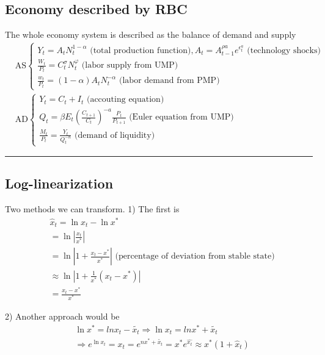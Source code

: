 \documentclass{article}
\newcommand*\sepline{%
  \begin{center}
    \rule[1ex]{.5\textwidth}{.5pt}
  \end{center}}
\begin{document}
\subsection{Economy described by RBC}
{\color{red}
The whole economy system is described as the balance of demand and supply
\begin{align}
&\text{AS}
\begin{cases} Y_{t}=A_{t}N_{t}^{1-\alpha} \text{ (total production function)}, A_t=A^{\rho a}_{t-1} e^{\epsilon^a_t} \text{ (technology shocks)}\\
\frac{W_{t}}{P_{t}}=C_{t}^{\sigma}N_{t}^{\varphi} \text{ (labor supply from UMP)}\\
\frac{w_{t}}{P_{t}}=(1-\alpha)A_{t}N_{t}^{-\alpha} \text{ (labor demand from PMP)}
\end{cases}
\\&
\text{AD}
\begin{cases}Y_{t}=C_{t}+I_{t} \text{ (accouting equation)}\\
Q_{t}=\beta E_{t} (\frac{C_{t+1}}{C_{t}})^{-a} \frac{P_{t}}{P_{t+1}}  \text{ (Euler equation from UMP)}\\
\frac{M_{t}}{P_{t}}=\frac{Y_{t}}{Q_{t}^{-n}}  \text{ (demand of liquidity)}
\end{cases}
\end{align}
}


\sepline
\subsection{Log-linearization}

Two methods we can transform. 
1) The first is 
\begin{align}
&
\hat x_{t}=\ln x_{t}-\ln x^{*}
\\&
=\ln |\frac{ x_{t}}{x^{*}}| 
\\&
=\ln |1+ \frac{x_{t}-x^{*}}{x^{*}}| \text{ (percentage of deviation from stable state)}
\\&
\approx \ln |1+\frac{1}{x^{*}}(x_{t}-x^{*})|
\\&
=\frac{x_{t}-x^{*}}{x^{*}}
\end{align}

2) Another approach would be
\begin{align}
&\ln x^{*}=ln x_{t}-\tilde{x_{t}}\Rightarrow \ln x_{t}=ln x^{*}+\tilde{x_{t}}
\\&
\Rightarrow e^{\ln x_{t}}=x_{t}=e^{n x^{*}+\tilde{x_{t}}}=x^{*}e^{\hat{x_{t}}} \approx x^{*} (1+\hat x_{t})
\end{align}
\end{document}
